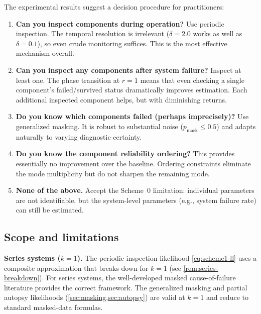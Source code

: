 \documentclass[12pt]{article}
\begin{document}
The experimental results suggest a decision procedure for practitioners:
\begin{enumerate}
  \item \textbf{Can you inspect components during operation?}
    Use periodic inspection.  The temporal resolution is irrelevant
    ($\delta = 2.0$ works as well as $\delta = 0.1$), so even crude
    monitoring suffices.  This is the most effective mechanism overall.

  \item \textbf{Can you inspect any components after system failure?}
    Inspect at least one.  The phase transition at $r = 1$ means that
    even checking a single component's failed/survived status dramatically
    improves estimation.  Each additional inspected component helps, but
    with diminishing returns.

  \item \textbf{Do you know which components failed (perhaps imprecisely)?}
    Use generalized masking.  It is robust to substantial noise
    ($p_{\text{mask}} \leq 0.5$) and adapts naturally to varying
    diagnostic certainty.

  \item \textbf{Do you know the component reliability ordering?}
    This provides essentially no improvement over the baseline.
    Ordering constraints eliminate the mode multiplicity but do not
    sharpen the remaining mode.

  \item \textbf{None of the above.}  Accept the Scheme~0 limitation:
    individual parameters are not identifiable, but the system-level
    parameters (e.g., system failure rate) can still be estimated.
\end{enumerate}

\subsection{Scope and limitations}\label{sec:scope}

\textbf{Series systems ($k = 1$).}
The periodic inspection likelihood \eqref{eq:scheme1-ll} uses a composite
approximation that breaks down for $k = 1$ (see \cref{rem:series-breakdown}).
For series systems, the well-developed masked cause-of-failure literature
\citep{Miyakawa1984, LinUsherGuess1993, CraiuDuchesne2004} provides the
correct framework.  The generalized masking and partial autopsy likelihoods
(\cref{sec:masking,sec:autopsy}) are valid at $k = 1$ and reduce to
standard masked-data formulas.
\end{document}
